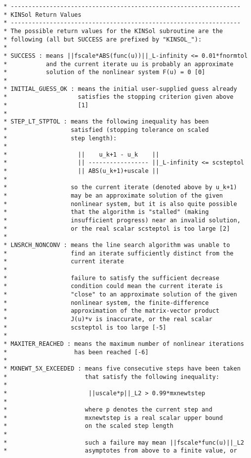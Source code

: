 \documentclass[11pt]{article}
\begin{document}
\begin{verbatim}
 * -----------------------------------------------------------------
 * KINSol Return Values
 * -----------------------------------------------------------------
 * The possible return values for the KINSol subroutine are the
 * following (all but SUCCESS are prefixed by "KINSOL_"):
 *
 * SUCCESS : means ||fscale*ABS(func(u))||_L-infinity <= 0.01*fnormtol
 *           and the current iterate uu is probably an approximate
 *           solution of the nonlinear system F(u) = 0 [0]
 *
 * INITIAL_GUESS_OK : means the initial user-supplied guess already
 *                    satisfies the stopping criterion given above
 *                    [1]
 *
 * STEP_LT_STPTOL : means the following inequality has been
 *                  satisfied (stopping tolerance on scaled
 *                  step length):
 *
 *                    ||    u_k+1 - u_k    ||
 *                    || ----------------- ||_L-infinity <= scsteptol
 *                    || ABS(u_k+1)+uscale ||
 *
 *                  so the current iterate (denoted above by u_k+1)
 *                  may be an approximate solution of the given
 *                  nonlinear system, but it is also quite possible
 *                  that the algorithm is "stalled" (making
 *                  insufficient progress) near an invalid solution,
 *                  or the real scalar scsteptol is too large [2]
 *
 * LNSRCH_NONCONV : means the line search algorithm was unable to
 *                  find an iterate sufficiently distinct from the
 *                  current iterate
 *
 *                  failure to satisfy the sufficient decrease
 *                  condition could mean the current iterate is
 *                  "close" to an approximate solution of the given
 *                  nonlinear system, the finite-difference
 *                  approximation of the matrix-vector product
 *                  J(u)*v is inaccurate, or the real scalar
 *                  scsteptol is too large [-5]
 *
 * MAXITER_REACHED : means the maximum number of nonlinear iterations
 *                   has been reached [-6]
 *
 * MXNEWT_5X_EXCEEDED : means five consecutive steps have been taken
 *                      that satisfy the following inequality:
 *
 *                       ||uscale*p||_L2 > 0.99*mxnewtstep
 *
 *                      where p denotes the current step and
 *                      mxnewtstep is a real scalar upper bound
 *                      on the scaled step length
 *
 *                      such a failure may mean ||fscale*func(u)||_L2
 *                      asymptotes from above to a finite value, or

\end{verbatim}
\end{document}
